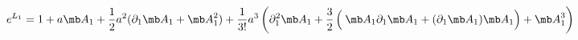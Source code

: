 \begin{equation}
e^{L_{1}}=1+a{\mb A}_{1}+\frac{1}{2}a^{2}(\partial_{1}{\mb A}_{1}+{\mb A}_{1}^{2})+\frac{1}{3!}a^{3}\left(\partial^{2}_{1}{\mb A}_{1}+\frac{3}{2}
\left(\frac{}{} {\mb A}_{1}\partial_{1}{\mb A}_{1}+(\partial_{1}{\mb A}_{1}){\mb A}_{1}\right)+{\mb A}_1^3\right)
\label{U1FGK}
\end{equation}

